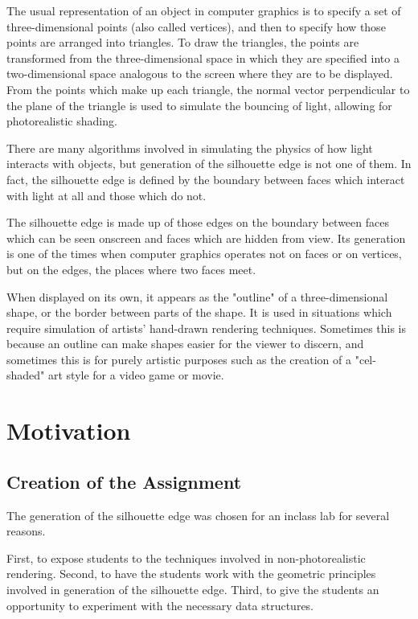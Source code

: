 \documentclass[10pt,twocolumn]{article}
\begin{document}
The usual representation of an object in computer graphics is to specify a set of three-dimensional points (also called vertices), and then to specify how those points are arranged into triangles.  To draw the triangles, the points are transformed from the three-dimensional space in which they are specified into a two-dimensional space analogous to the screen where they are to be displayed.  From the points which make up each triangle, the normal vector perpendicular to the plane of the triangle is used to simulate the bouncing of light, allowing for photorealistic shading.  

There are many algorithms involved in simulating the physics of how light interacts with objects, but generation of the silhouette edge is not one of them.  In fact, the silhouette edge is defined by the boundary between faces which interact with light at all and those which do not.  

The silhouette edge is made up of those edges on the boundary between faces which can be seen onscreen and faces which are hidden from view.  Its generation is one of the times when computer graphics operates not on faces or on vertices, but on the edges, the places where two faces meet.  

When displayed on its own, it appears as the "outline" of a three-dimensional shape, or the border between parts of the shape.  It is used in situations which require simulation of artists' hand-drawn rendering techniques.  Sometimes this is because an outline can make shapes easier for the viewer to discern, and sometimes this is for purely artistic purposes such as the creation of a "cel-shaded" art style for a video game or movie.  

\section{Motivation}
\subsection{Creation of the Assignment}
The generation of the silhouette edge was chosen for an inclass lab for several reasons.  

First, to expose students to the techniques involved in non-photorealistic rendering.  Second, to have the students work with the geometric principles involved in generation of the silhouette edge.  Third, to give the students an opportunity to experiment with the necessary data structures.  
\end{document}
